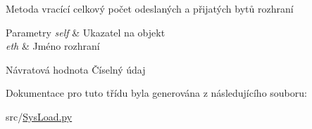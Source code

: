 Metoda vracící celkový počet odeslaných a přijatých bytů rozhraní 


\begin{DoxyParams}{Parametry}
{\em self} & Ukazatel na objekt \\
\hline
{\em eth} & Jméno rozhraní \\
\hline
\end{DoxyParams}
\begin{DoxyReturn}{Návratová hodnota}
Číselný údaj 
\end{DoxyReturn}


Dokumentace pro tuto třídu byla generována z následujícího souboru\-:\begin{DoxyCompactItemize}
\item 
src/\hyperlink{SysLoad_8py}{Sys\-Load.\-py}\end{DoxyCompactItemize}
